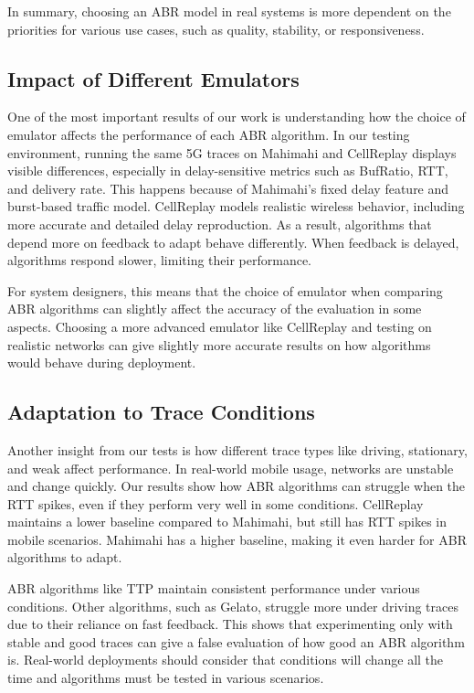 In summary, choosing an ABR model in real systems is more dependent on the priorities for various use cases, such as quality, stability, or responsiveness.

\subsection*{Impact of Different Emulators}

One of the most important results of our work is understanding how the choice of emulator affects the performance of each ABR algorithm. In our testing environment, running the same 5G traces on Mahimahi and CellReplay displays visible differences, especially in delay-sensitive metrics such as BufRatio, RTT, and delivery rate. This happens because of Mahimahi's fixed delay feature and burst-based traffic model. CellReplay models realistic wireless behavior, including more accurate and detailed delay reproduction. As a result, algorithms that depend more on feedback to adapt behave differently. When feedback is delayed, algorithms respond slower, limiting their performance.

For system designers, this means that the choice of emulator when comparing ABR algorithms can slightly affect the accuracy of the evaluation in some aspects. Choosing a more advanced emulator like CellReplay and testing on realistic networks can give slightly more accurate results on how algorithms would behave during deployment.

\subsection*{Adaptation to Trace Conditions}

Another insight from our tests is how different trace types like driving, stationary, and weak affect performance. In real-world mobile usage, networks are unstable and change quickly. Our results show how ABR algorithms can struggle when the RTT spikes, even if they perform very well in some conditions. CellReplay maintains a lower baseline compared to Mahimahi, but still has RTT spikes in mobile scenarios. Mahimahi has a higher baseline, making it even harder for ABR algorithms to adapt.

ABR algorithms like TTP maintain consistent performance under various conditions. Other algorithms, such as Gelato, struggle more under driving traces due to their reliance on fast feedback. This shows that experimenting only with stable and good traces can give a false evaluation of how good an ABR algorithm is. Real-world deployments should consider that conditions will change all the time and algorithms must be tested in various scenarios.

